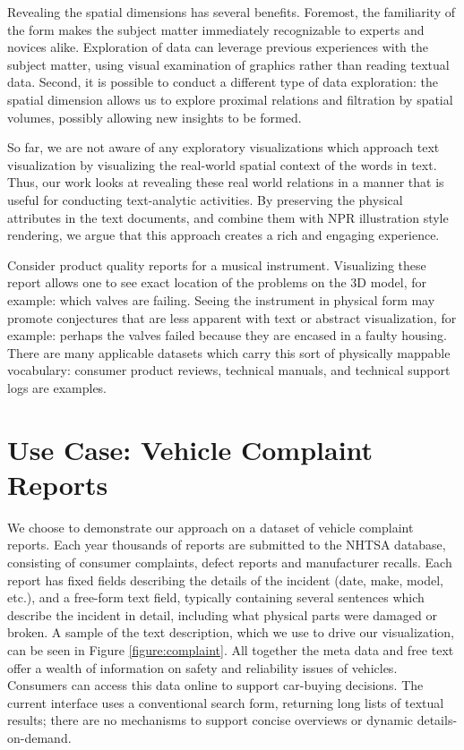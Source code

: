 Revealing the spatial dimensions has several benefits. Foremost, the
familiarity of the form makes the subject matter immediately recognizable
to experts and novices alike. Exploration of data can leverage previous 
experiences with the subject matter, using visual examination of graphics 
rather than reading textual data. Second, it is possible to conduct a different
type of data exploration: the spatial dimension allows us to explore
proximal relations and filtration by spatial volumes, possibly allowing
new insights to be formed.

So far, we are not aware of any exploratory visualizations which approach text
visualization by visualizing the real-world spatial context of the words in
text. Thus, our work looks at revealing these real world relations in a manner
that is useful for conducting text-analytic activities. By preserving the physical
attributes in the text documents, and combine them with NPR illustration style 
rendering, we argue that this approach creates a rich and engaging experience.

Consider product quality reports for a musical instrument. Visualizing
these report allows one to see exact location of the problems on the
3D model, for example: which valves are failing. Seeing the instrument
in physical form may promote conjectures that are less apparent
with text or abstract visualization, for example: perhaps the valves
failed because they are encased in a faulty housing. There are many
applicable datasets which carry this sort of physically mappable vocabulary:
consumer product reviews, technical manuals, and technical
support logs are examples.



\section{Use Case: Vehicle Complaint Reports}
We choose to demonstrate our approach on a dataset of vehicle complaint
reports. Each year thousands of reports are submitted to the
NHTSA database, consisting of consumer complaints, defect reports
and manufacturer recalls. Each report has fixed fields describing the
details of the incident (date, make, model, etc.), and a free-form text
field, typically containing several sentences which describe the incident
in detail, including what physical parts were damaged or broken. A sample of the
text description, which we use to drive our visualization, can be seen in Figure
\ref{figure:complaint}.  All together the meta data and free
text offer a wealth of information on safety and reliability issues of
vehicles. Consumers can access this data online to support car-buying
decisions. The current interface uses a conventional search form, returning
long lists of textual results; there are no mechanisms to support
concise overviews or dynamic details-on-demand. 


